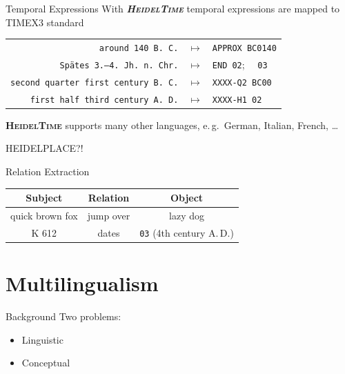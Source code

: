 \documentclass[xcolor=x11names, aspectratio=169,usenames,dvipsnames]{beamer}
\begin{document}
\begin{frame}{Temporal Expressions}
With \textbf{\textit{\textsc{HeidelTime}}} temporal expressions are mapped to TIMEX3 standard
\begin{center}
{\renewcommand{\arraystretch}{1.2}%
\begin{tabular}{rcl}
\texttt{around 140 B.\,C.}&$\longmapsto$&\texttt{APPROX BC0140}\\
\texttt{Spätes 3.–4.\ Jh.\ n.\,Chr.}&$\longmapsto$&\texttt{END 02};~~ \texttt{03}\\
\texttt{second quarter first century B.\,C.}&$\longmapsto$&\texttt{XXXX-Q2 BC00}\\
\texttt{first half third century A.\,D.}&$\longmapsto$&\texttt{XXXX-H1 02}\\
\end{tabular}
}
\end{center}
\pause
\textbf{\textsc{HeidelTime}} supports many other languages, e.\,g.\ German, Italian, French, \dots

HEIDELPLACE?!
\end{frame}

\begin{frame}{Relation Extraction}
\begin{center}
\begin{tabularx}{\textwidth}{CCC}
\toprule
\textbf{Subject}&\textbf{Relation}&\textbf{Object}\\\midrule
quick brown fox&jump over&lazy dog\\
K 612&dates&\texttt{03} (4th century A.\,D.)\\
\bottomrule
\end{tabularx}
\end{center}
\end{frame}

\section{Multilingualism}

\begin{frame}{Background}
Two problems:
\begin{itemize}
\item Linguistic
\item Conceptual
\end{itemize}
\end{frame}
\end{document}
